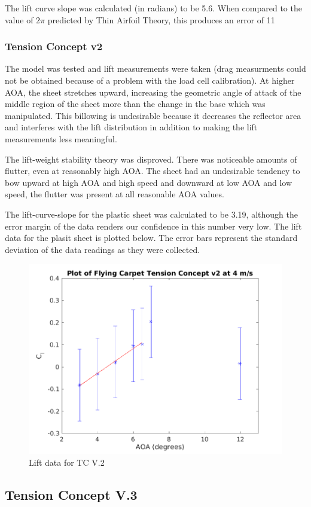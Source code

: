 \documentclass[12pt]{report} %
\begin{document}
The lift curve slope was calculated (in radians) to be 5.6.  When compared to the value of $2\pi$ predicted by Thin Airfoil Theory,
this produces an error of 11%

\subsubsection{Tension Concept v2}
The model was tested and lift measurements were taken (drag measurments could not be obtained because of a problem with the load
cell calibration).
At higher AOA, the sheet stretches upward, increasing the geometric angle of attack of the middle region of the sheet more than the change
in the base which was manipulated. This billowing is undesirable because it decreases the reflector area and interferes with the lift distribution
in addition to making the lift measurements less meaningful.

The lift-weight stability theory was disproved.  There was noticeable amounts of flutter, even at reasonably high AOA. The sheet had an undesirable
tendency to bow upward at high AOA and high speed and downward at low AOA and low speed, the flutter was present at all reasonable AOA values.

The lift-curve-slope for the plastic sheet was calculated to be 3.19, although the error margin of the data renders our confidence in this number
very low. The lift data for the plasit sheet is plotted below. The error bars represent the standard deviation of the data readings as they were
collected.

\begin{figure}
	\includegraphics[width = 0.6 \linewidth]{tension_model_lift.png}
	\caption{Lift data for TC V.2}
	\label{tcv2}
\end{figure}

\subsection{Tension Concept V.3}
\end{document}
